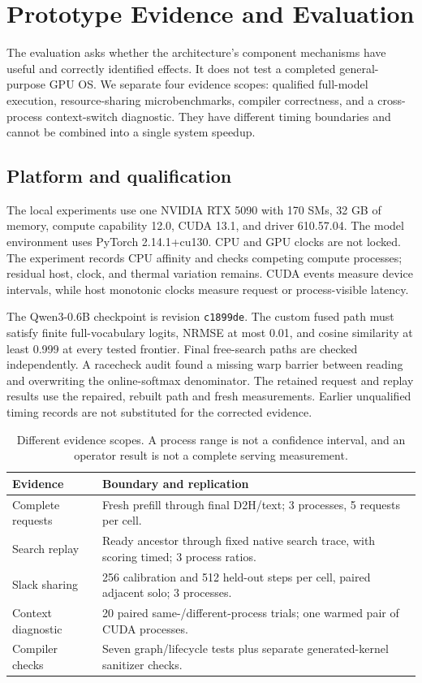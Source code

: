 \section{Prototype Evidence and Evaluation}
\label{sec:evidence}
The evaluation asks whether the architecture's component mechanisms have
useful and correctly identified effects. It does not test a completed
general-purpose GPU OS. We separate four evidence scopes: qualified full-model
execution, resource-sharing microbenchmarks, compiler correctness, and a
cross-process context-switch diagnostic. They have different timing boundaries
and cannot be combined into a single system speedup.

\subsection{Platform and qualification}
The local experiments use one NVIDIA RTX 5090 with 170 SMs, 32 GB of memory,
compute capability 12.0, CUDA 13.1, and driver 610.57.04. The model environment
uses PyTorch 2.14.1+cu130. CPU and GPU clocks are not locked. The experiment
records CPU affinity and checks competing compute processes; residual host,
clock, and thermal variation remains. CUDA events measure device intervals,
while host monotonic clocks measure request or process-visible latency.

The Qwen3-0.6B checkpoint is revision \texttt{c1899de}. The custom fused path
must satisfy finite full-vocabulary logits, NRMSE at most 0.01, and cosine
similarity at least 0.999 at every tested frontier. Final free-search paths
are checked independently. A racecheck audit found a missing warp barrier
between reading and overwriting the online-softmax denominator. The retained
request and replay results use the repaired, rebuilt path and fresh
measurements. Earlier unqualified timing records are not substituted for
the corrected evidence.

\begin{table}[t]
\centering\small
\begin{tabular}{p{}p{}}
\toprule
Evidence & Boundary and replication \\
\midrule
Complete requests & Fresh prefill through final D2H/text; 3 processes, 5 requests per cell. \\
Search replay & Ready ancestor through fixed native search trace, with scoring timed; 3 process ratios. \\
Slack sharing & 256 calibration and 512 held-out steps per cell, paired adjacent solo; 3 processes. \\
Context diagnostic & 20 paired same-/different-process trials; one warmed pair of CUDA processes. \\
Compiler checks & Seven graph/lifecycle tests plus separate generated-kernel sanitizer checks. \\
\bottomrule
\end{tabular}
\caption{Different evidence scopes. A process range is not a confidence
interval, and an operator result is not a complete serving measurement.}
\label{tab:protocol}
\end{table}

